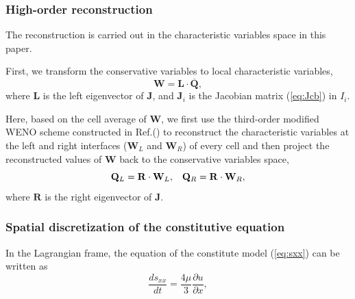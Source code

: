 \documentclass[review]{elsarticle}
\begin{document}
\subsubsection{High-order reconstruction}\label{hor}
The reconstruction is carried out in the characteristic variables  space in this paper.

First, we transform the conservative variables to local characteristic variables,
\begin{equation}\label{eq:chaVar}
  \mathbf{W} = \mathbf{L} \cdot \overline{\mathbf{Q}},
\end{equation}
where $\mathbf{L}$ is the left eigenvector of $\mathbf{J}$, and $\mathbf{J}_i$ is the Jacobian matrix  (\ref{eq:Jcb}) in $I_i$.

Here, based on the cell average of $\mathbf{W}$, we  first use the third-order modified WENO scheme constructed in Ref.(\cite{liu2018novel}) to reconstruct the characteristic variables at the  left and right interfaces ($\mathbf{W}_L$ and $\mathbf{W}_R$)  of every cell and then project the reconstructed values of $\mathbf{W}$ back to the conservative variables space,
\begin{equation}
  \mathbf{Q}_L = \mathbf{R} \cdot \mathbf{W}_L, \hspace{0.3cm}   \mathbf{Q}_R = \mathbf{R} \cdot \mathbf{W}_R,
\end{equation}
where $\mathbf{R}$ is the right eigenvector of $\mathbf{J}$.

\subsubsection{Spatial discretization of the constitutive equation}
In the Lagrangian frame, the equation of the constitute model (\ref{eq:sxx}) can be written as
\begin{equation}
  \frac{ds_{xx}}{dt} = \frac{4\mu }{3} \frac{\partial u}{\partial x},
\end{equation}
\end{document}

